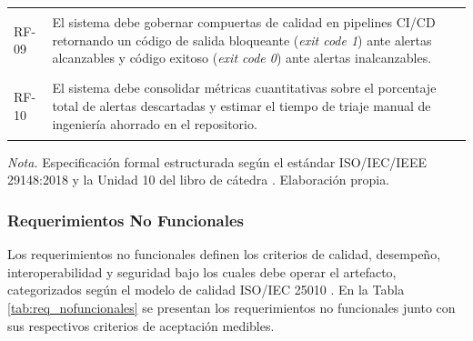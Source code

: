 \begin{table}[H]
\begin{tabularx}{\textwidth}{>{\bfseries\raggedright\arraybackslash}p{2.0cm} X}
RF-09 & El sistema debe gobernar compuertas de calidad en pipelines CI/CD retornando un código de salida bloqueante (\textit{exit code 1}) ante alertas alcanzables y código exitoso (\textit{exit code 0}) ante alertas inalcanzables. \\
\addlinespace
RF-10 & El sistema debe consolidar métricas cuantitativas sobre el porcentaje total de alertas descartadas y estimar el tiempo de triaje manual de ingeniería ahorrado en el repositorio. \\
\bottomrule
\end{tabularx}
\vspace{2pt}
\begin{flushleft}
\scriptsize \textit{Nota.} Especificación formal estructurada según el estándar ISO/IEC/IEEE 29148:2018 y la Unidad 10 del libro de cátedra \parencite{iso2018req, torres2026proyecto}. Elaboración propia. %
\end{flushleft}
\end{table}

\subsubsection{Requerimientos No Funcionales}
Los requerimientos no funcionales definen los criterios de calidad, desempeño, interoperabilidad y seguridad bajo los cuales debe operar el artefacto, categorizados según el modelo de calidad ISO/IEC 25010 \parencite{iso2011sqa, torres2026proyecto}. %
En la Tabla \ref{tab:req_nofuncionales} se presentan los requerimientos no funcionales junto con sus respectivos criterios de aceptación medibles. %

